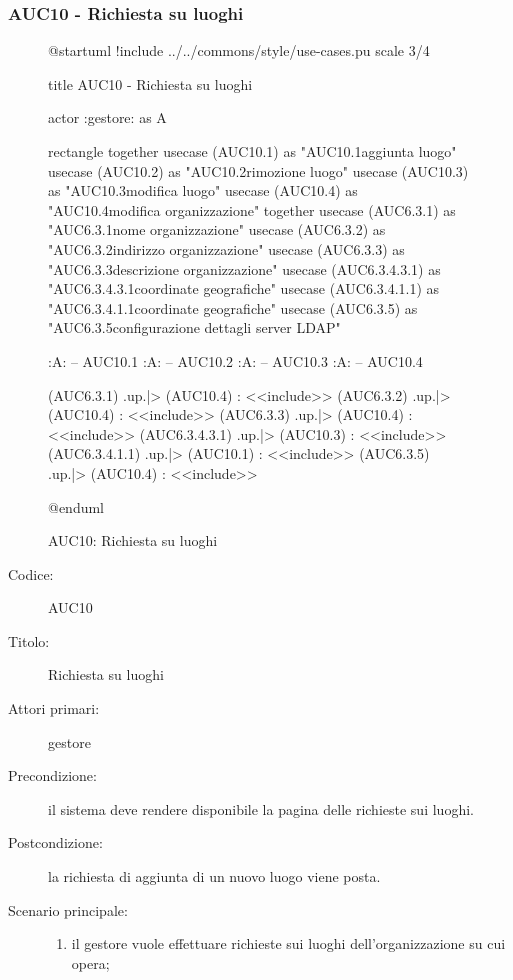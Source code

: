 \documentclass[casi-duso]{subfiles}
\begin{document}
\subsubsection{AUC10 - Richiesta su luoghi}%
\label{subsub:AUC10}

\begin{figure}[h!] 
  \centering 
  \begin{plantuml}
  @startuml 
  !include ../../commons/style/use-cases.pu
  scale 3/4

  title AUC10 - Richiesta su luoghi

  actor :gestore: as A

  rectangle {
    together {
      usecase (AUC10.1) as "AUC10.1\nRichiesta aggiunta luogo"
      usecase (AUC10.2) as "AUC10.2\nRichiesta rimozione luogo"
      usecase (AUC10.3) as "AUC10.3\nRichiesta modifica luogo"
      usecase (AUC10.4) as "AUC10.4\nRichiesta modifica organizzazione"
    }
    together {
      usecase (AUC6.3.1) as "AUC6.3.1\nModifica nome organizzazione"
      usecase (AUC6.3.2) as "AUC6.3.2\nModifica indirizzo organizzazione"
      usecase (AUC6.3.3) as "AUC6.3.3\nModifica descrizione organizzazione"
      usecase (AUC6.3.4.3.1) as "AUC6.3.4.3.1\nModifica coordinate geografiche"
      usecase (AUC6.3.4.1.1) as "AUC6.3.4.1.1\nInserisci coordinate geografiche"
      usecase (AUC6.3.5) as "AUC6.3.5\nModifica configurazione dettagli server LDAP"
    }
  }

  :A: -- AUC10.1
  :A: -- AUC10.2
  :A: -- AUC10.3
  :A: -- AUC10.4


  (AUC6.3.1) .up.|> (AUC10.4) : <<include>>
  (AUC6.3.2) .up.|> (AUC10.4) : <<include>>
  (AUC6.3.3) .up.|> (AUC10.4) : <<include>>
  (AUC6.3.4.3.1) .up.|> (AUC10.3) : <<include>>
  (AUC6.3.4.1.1) .up.|> (AUC10.1) : <<include>>
  (AUC6.3.5) .up.|> (AUC10.4) : <<include>>

  @enduml
  \end{plantuml} 
  \caption{AUC10: Richiesta su luoghi} 
  \label{fig:auc10} 
\end{figure}

\begin{description}
  \item[Codice:] AUC10
  \item[Titolo:] Richiesta su luoghi
  \item[Attori primari:] gestore
  \item[Precondizione:] il sistema deve rendere disponibile la pagina delle richieste sui luoghi.
  \item[Postcondizione:] la richiesta di aggiunta di un nuovo luogo viene posta.
  \item[Scenario principale:]
  \begin{enumerate}
    \item il gestore vuole effettuare richieste sui luoghi dell'organizzazione su cui opera;
  \end{enumerate}
\end{description}
\end{document}

